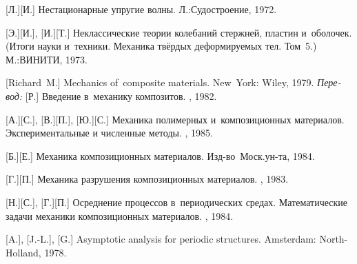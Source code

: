 \begin{thebibliography}{123}
\begin{otherlanguage}{russian}
[Л.][И.] Нестационарные упругие волны. Л.:\;Судостроение, 1972. 

[Э.][И.], [И.][Т.] Неклассические теории колебаний стержней, пластин и~оболочек. (Итоги науки и~техники. Механика твёрдых деформируемых тел. Том~5.) М.:\;ВИНИТИ, 1973. 

%
%



[Richard~M.] Mechanics of~composite materials. New~York: Wiley, 1979. 
\emph{Перевод:} [Р.] Введение в~механику композитов. \mirpublisher, 1982. 

[А.][С.], [В.][П.], [Ю.][С.] Механика полимерных и~композиционных материалов. Экспериментальные и численные методы. \naukapublisher, 1985. 

[Б.][Е.] Механика композиционных материалов. Изд\hbox{-}во~Моск.\:ун\hbox{-}та, 1984. 

[Г.][П.] Механика разрушения композиционных материалов. \naukapublisher, 1983. 

[Н.][С.], [Г.][П.] Осреднение процессов в~периодических средах. Математические задачи механики композиционных материалов. \naukapublisher, 1984. 

[A.], %
[J.-L.], %
[G.]
Asymptotic analysis for periodic structures. Amsterdam: North\hbox{-}Holland, 1978. 


\end{otherlanguage}
\end{thebibliography}
